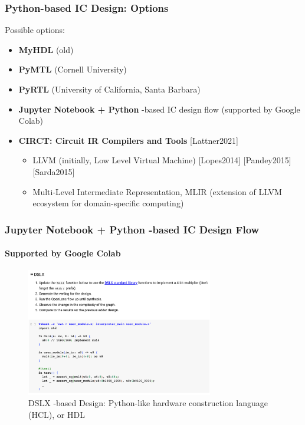 \documentclass[xcolor={usenames,dvipsnames},hyperref={hyperindex,bookmarks}]{beamer}
\begin{document}
\begin{frame}
	\frametitle{Python-based IC Design: Options}
	
	Possible options:
	\begin{itemize}
	\item {\bf MyHDL} (old)
	\item {\bf PyMTL} (Cornell University)
	\item {\bf PyRTL} (University of California, Santa Barbara)
	\item {\bf Jupyter Notebook + Python} -based IC design flow (supported by Google Colab)
	\item {\bf CIRCT: Circuit {IR} Compilers and Tools} [Lattner2021]
		\begin{itemize}
		\item LLVM (initially, Low Level Virtual Machine) [Lopes2014] [Pandey2015] [Sarda2015]
		\item Multi-Level Intermediate Representation, MLIR (extension of LLVM ecosystem for domain-specific computing)
		\end{itemize}
	\end{itemize}

\end{frame}






\begin{frame}
	\frametitle{Jupyter Notebook + Python -based IC Design Flow}
	\framesubtitle{Supported by Google Colab}
	
	\begin{figure}
		\centering
		\includegraphics[height=2.2in]{./pics/JupyterNotebookICDesign1}
		\caption{DSLX -based Design: Python-like hardware construction language (HCL), or HDL}
	\end{figure}
\end{frame}
\end{document}
